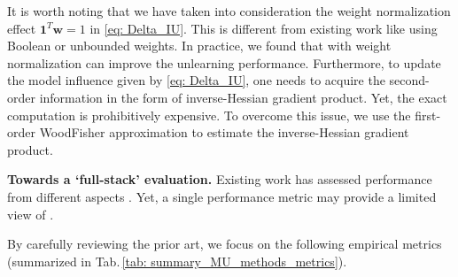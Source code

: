 
It is worth noting that we have taken into consideration the weight normalization effect $\mathbf 1^T \mathbf w =1$ 
 in  \eqref{eq: Delta_IU}. This is   different from  existing work like \citet[Sec.\,3]{izzo2021approximate} using Boolean or unbounded weights. In practice, we found that {\IU} with  weight normalization can improve the unlearning performance. 
Furthermore, 
to update the model influence given by \eqref{eq: Delta_IU}, one needs to acquire the second-order information in the form of  inverse-Hessian gradient product. Yet, the exact computation is prohibitively expensive. To overcome this issue, we use the first-order WoodFisher approximation \cite{singh2020woodfisher} to estimate  the inverse-Hessian gradient product. 

\noindent \textbf{Towards a `full-stack' {\MU} evaluation.}
Existing work   has assessed  {\MU} performance from different aspects \cite{thudi2021unrolling,golatkar2020eternal,graves2021amnesiac}. 
Yet, a single  performance metric may provide   a limited %
view of {\MU} \cite{thudi2022necessity}. 
\iffalse 
For example, it was shown in \cite{thudi2022necessity} that the unlearning error in the parameter space (given by the Euclidean distance between an unlearned model and retrained one) could give us a false sense of successful unlearning since it might be possible to   unlearn without modifying the model at all \YL{i think the above sentence is confusing: is it true that you can unlearn without modifying the model? that sounds unlikely..or did you mean that minimizing the unlearning error defined above can return an unmodified model }. 
\fi 
By carefully reviewing the prior art, we focus on the following empirical metrics (summarized in  Tab.\,\ref{tab: summary_MU_methods_metrics}).

